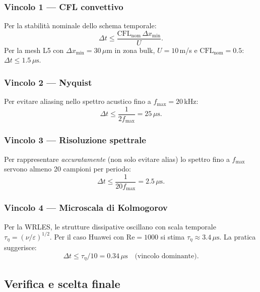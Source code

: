 \documentclass[11pt,a4paper]{article}
\newcommand{\Rey}{\mathrm{Re}}
\newcommand{\mum}{\,\mu\mathrm{m}}
\newcommand{\mus}{\,\mu\mathrm{s}}
\begin{document}
\subsubsection*{Vincolo 1 — CFL convettivo}

Per la stabilità nominale dello schema temporale:
\begin{equation}
  \Delta t \leq \frac{\mathrm{CFL}_{\mathrm{nom}}\,\Delta x_{\min}}{U}.
\end{equation}
Per la mesh L5 con $\Delta x_{\min} = 30\mum$ in zona bulk, $U=10$\,m/s
e $\mathrm{CFL}_{\mathrm{nom}} = 0.5$:
$\Delta t \leq 1.5\mus$.

\subsubsection*{Vincolo 2 — Nyquist}

Per evitare aliasing nello spettro acustico fino a $f_{\max}=20$\,kHz:
\begin{equation}
  \Delta t \leq \frac{1}{2 f_{\max}} = 25\mus.
\end{equation}

\subsubsection*{Vincolo 3 — Risoluzione spettrale}

Per rappresentare \emph{accuratamente} (non solo evitare alias) lo
spettro fino a $f_{\max}$ servono almeno 20 campioni per periodo:
\begin{equation}
  \Delta t \leq \frac{1}{20 f_{\max}} = 2.5\mus.
\end{equation}

\subsubsection*{Vincolo 4 — Microscala di Kolmogorov}

Per la WRLES, le strutture dissipative oscillano con scala temporale
$\tau_\eta = (\nu/\varepsilon)^{1/2}$. Per il caso Huawei con
$\Rey=1000$ si stima $\tau_\eta \approx 3.4\mus$. La pratica
suggerisce:
\begin{equation}
  \Delta t \leq \tau_\eta/10 = 0.34\mus \quad
  \text{(vincolo dominante).}
\end{equation}

\subsection{Verifica e scelta finale}
\end{document}
